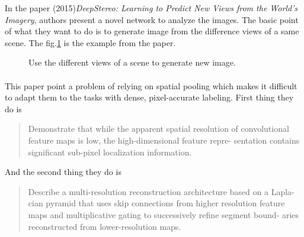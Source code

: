 \documentclass[border=0.5in]{blog}
\begin{document}
    In the paper (2015)\textit{DeepStereo: Learning to Predict New Views from the World’s Imagery}, authors present a novel network to analyze the images.
    The basic point of what they want to do is to generate image from the difference views of
    a same scene. The fig.\ref{fig:DeepStereo} is the example from  the paper.
    \begin{figure}
        \centering
    
        \caption{Use the different views of a scene to generate new image.}
        \label{fig:DeepStereo}
    \end{figure}
    
    \paragraph{\citep{DBLP:journals/corr/GhiasiF16}}
    
    This paper point a problem of relying on spatial pooling which makes it difficult to adapt them to the tasks with dense, pixel-accurate labeling.
    First thing they do is
    \begin{quote}
        Demonstrate that while the apparent spatial resolution of convolutional feature maps is low, the high-dimensional feature repre- sentation contains significant sub-pixel localization information.
    \end{quote}
    And the second thing they do is
    \begin{quote}
        Describe a multi-resolution reconstruction architecture based on a Lapla- cian pyramid that uses skip connections from higher resolution feature maps and multiplicative gating to successively refine segment bound- aries reconstructed from lower-resolution maps.
    \end{quote}

    \paragraph{\citep{DBLP:journals/corr/HeZRS15}}
    
\end{document}
